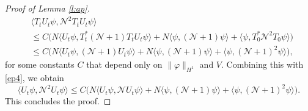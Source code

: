\documentclass[11pt,a4paper,DIV11]{scrartcl}	%
\newcommand{\N}{\mathcal{N}}
\begin{document}
\begin{proof}[Proof of Lemma \ref{l:ap}]
\begin{align*}
    & \langle T_t U_t \psi, \N^2 T_t U_t \psi \rangle \\
    & \le C \Big( N \langle U_t \psi, T_t^* (\N+1) T_t U_t \psi \rangle + N
    \langle \psi, (\N+1) \psi \rangle + \langle \psi, T^*_0 \N^2 T_0 \psi \rangle
    \Big) \\
    & \le C \Big( N \langle U_t \psi, (\N+1) U_t \psi \rangle + N \langle
    \psi, (\N+1) \psi \rangle + \langle \psi, (\N+1)^2 \psi \rangle \Big),
  \end{align*}
  for some constants $C$ that depend only on $\| \varphi \|_{H^1}$
  and $V$. Combining this with \eqref{ep4}, we obtain
  \begin{displaymath}
    \langle U_t \psi, \N^2 U_t \psi \rangle 
     \le C \Big( N \langle U_t \psi, \N U_t \psi \rangle + N \langle
    \psi, (\N+1) \psi \rangle + \langle \psi, (\N+1)^2 \psi \rangle \Big).
  \end{displaymath}
  This concludes the proof.
\end{proof}
\end{document}
